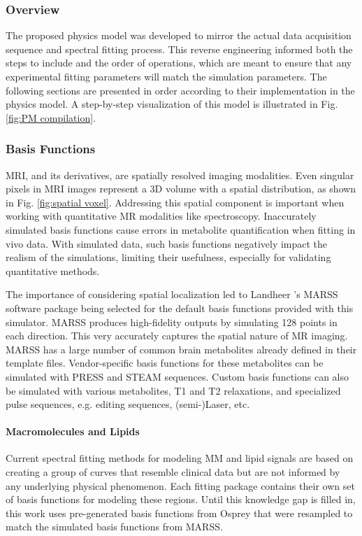 \subsubsection{Overview}
The proposed physics model was developed to mirror the actual data acquisition sequence and spectral fitting process. This reverse engineering informed both the steps to include and the order of operations, which are meant to ensure that any experimental fitting parameters will match the simulation parameters. The following sections are presented in order according to their implementation in the physics model. A step-by-step visualization of this model is illustrated in Fig. \ref{fig:PM compilation}.




\subsubsection{Basis Functions}
MRI, and its derivatives, are spatially resolved imaging modalities. Even singular pixels in MRI images represent a 3D volume with a spatial distribution, as shown in Fig. \ref{fig:spatial voxel}. Addressing this spatial component is important when working with quantitative MR modalities like spectroscopy. Inaccurately simulated basis functions cause errors in metabolite quantification when fitting in vivo data. With simulated data, such basis functions negatively impact the realism of the simulations, limiting their usefulness, especially for validating quantitative methods.
 
The importance of considering spatial localization led to Landheer \etal's MARSS\cite{Landheer2021} software package being selected for the default basis functions provided with this simulator. MARSS produces high-fidelity outputs by simulating 128 points in each direction. This very accurately captures the spatial nature of MR imaging. MARSS has a large number of common brain metabolites already defined in their template files. Vendor-specific basis functions for these metabolites can be simulated with PRESS and STEAM sequences. Custom basis functions can also be simulated with various metabolites, T1 and T2 relaxations, and specialized pulse sequences, e.g. editing sequences, (semi-)Laser, etc.
 

 
\paragraph{Macromolecules and Lipids}
Current spectral fitting methods for modeling MM and lipid signals are based on creating a group of curves that resemble clinical data but are not informed by any underlying physical phenomenon. Each fitting package contains their own set of basis functions for modeling these regions. Until this knowledge gap is filled in, this work uses pre-generated basis functions from Osprey\cite{Oeltzschner2020} that were resampled to match the simulated basis functions from MARSS.
 
